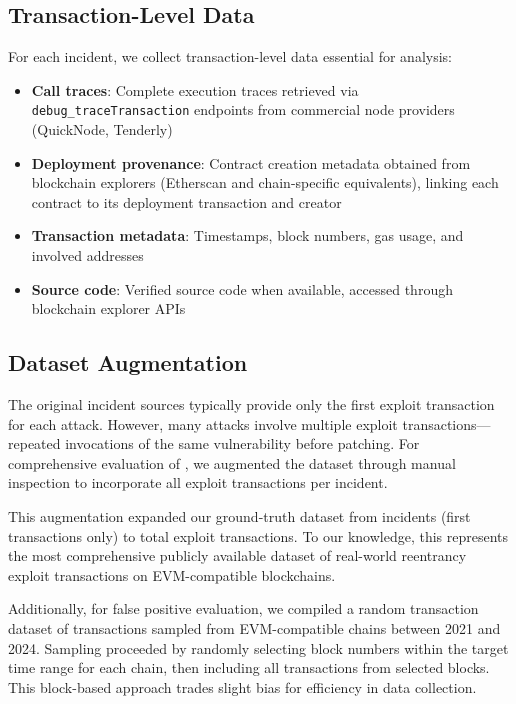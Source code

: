 \subsection{Transaction-Level Data}

For each incident, we collect transaction-level data essential for analysis:

\begin{itemize}
    \item \textbf{Call traces}: Complete execution traces retrieved via \lstinline{debug_traceTransaction} endpoints from commercial node providers (QuickNode, Tenderly)
    
    \item \textbf{Deployment provenance}: Contract creation metadata obtained from blockchain explorers (Etherscan and chain-specific equivalents), linking each contract to its deployment transaction and creator
    
    \item \textbf{Transaction metadata}: Timestamps, block numbers, gas usage, and involved addresses
    
    \item \textbf{Source code}: Verified source code when available, accessed through blockchain explorer APIs
\end{itemize}

\subsection{Dataset Augmentation}

The original incident sources typically provide only the first exploit transaction for each attack. However, many attacks involve multiple exploit transactions---repeated invocations of the same vulnerability before patching. For comprehensive evaluation of \ToolName, we augmented the dataset through manual inspection to incorporate all exploit transactions per incident.

This augmentation expanded our ground-truth dataset from  incidents (first transactions only) to  total exploit transactions. To our knowledge, this represents the most comprehensive publicly available dataset of real-world reentrancy exploit transactions on EVM-compatible blockchains.

Additionally, for false positive evaluation, we compiled a random transaction dataset of  transactions sampled from  EVM-compatible chains between 2021 and 2024. Sampling proceeded by randomly selecting block numbers within the target time range for each chain, then including all transactions from selected blocks. This block-based approach trades slight bias for efficiency in data collection.

